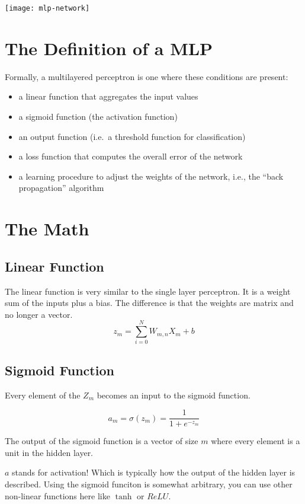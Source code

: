 \documentclass[letterpaper,12pt]{article}
\begin{document}
\texttt{[image: mlp-network]}

\section{The Definition of a MLP}

Formally, a multilayered perceptron is one where these conditions are present:

\begin{itemize}
    \item a linear function that aggregates the input values
    \item a sigmoid function (the activation function)
    \item an output function (i.e.\ a threshold function for classification)
    \item a loss function that computes the overall error of the network
    \item a learning procedure to adjust the weights of the network, i.e., the
        ``back propagation'' algorithm
\end{itemize}

\section{The Math}

\subsection{Linear Function}
The linear function is very similar to the single layer perceptron. It is a
weight sum of the inputs plus a bias. The difference is that the weights are
matrix and no longer a vector.
\[
    z_m = \sum_{i=0}^{N} W_{m,n} X_m + b
\]

\subsection{Sigmoid Function}
Every element of the $Z_m$ becomes an input to the sigmoid function.

\[
    a_m = \sigma(z_m) = \frac{1}{1 + e^{-z_m}}
\]

The output of the sigmoid function is a vector of size $m$ where every element
is a unit in the hidden layer.

$a$ stands for activation! Which is typically how the output of the hidden layer
is described. Using the sigmoid funciton is somewhat arbitrary, you can use other
non-linear functions here like $\tanh$ or $ReLU$.
\end{document}
